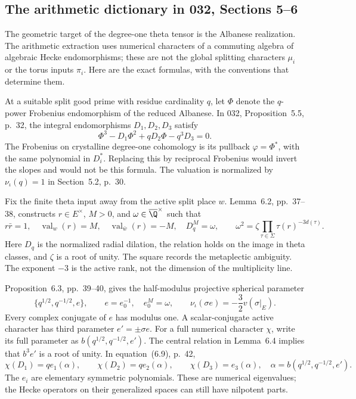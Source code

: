 \subsection{The arithmetic dictionary in 032, Sections 5--6}

The geometric target of the degree-one theta tensor is the Albanese
realization. The arithmetic extraction uses numerical characters of a
commuting algebra of algebraic Hecke endomorphisms; these are not the
global splitting characters $\mu_i$ or the torus inputs $\pi_i$.
Here are the exact formulas, with the conventions that determine them.

At a suitable split good prime with residue cardinality $q$, let
$\Phi$ denote the $q$-power Frobenius endomorphism of the reduced
Albanese. In 032, Proposition~5.5, p.~32, the integral endomorphisms
$D_1,D_2,D_3$ satisfy
\[
 \Phi^3-D_1\Phi^2+qD_2\Phi-q^3D_3=0.
\]
The Frobenius on crystalline degree-one cohomology is its pullback
$\varphi=\Phi^*$, with the same polynomial in $D_i^*$.
Replacing this by reciprocal Frobenius would invert the slopes and
would not be this formula. The valuation is normalized by
$\nu_\iota(q)=1$ in Section~5.2, p.~30.

Fix the finite theta input away from the active split place $w$.
Lemma~6.2, pp.~37--38, constructs $r\in E^\times$, $M>0$, and
$\omega\in\overline\Q^\times$ such that
\[
 r\bar r=1,\quad \operatorname{val}_w(r)=M,
 \quad\operatorname{val}_{\bar w}(r)=-M,
 \quad D_q^M=\omega,
 \qquad
 \omega^2=\zeta\prod_{\tau\in\Sigma}\tau(r)^{-3d(\tau)}.
\]
Here $D_q$ is the normalized radial dilation, the relation holds on
the image in theta classes, and $\zeta$ is a root of unity. The
square records the metaplectic ambiguity. The exponent $-3$ is
the active rank, not the dimension of the multiplicity line.

Proposition~6.3, pp.~39--40, gives the half-modulus projective
spherical parameter
\[
 \{q^{1/2},q^{-1/2},e\},\qquad
 e=e_0^{-1},\quad e_0^M=\omega,
 \qquad
 \nu_\iota(\sigma e)=-\frac32v(\sigma|_E).
\]
Every complex conjugate of $e$ has modulus one. A scalar-conjugate
active character has third parameter $e'=\pm\sigma e$.
For a full numerical character $\chi$, write its full parameter as
$b(q^{1/2},q^{-1/2},e')$. The central relation in Lemma~6.4
implies that $b^3e'$ is a root of unity. In equation~(6.9), p.~42,
\[
 \chi(D_1)=q e_1(\alpha),\qquad
 \chi(D_2)=q e_2(\alpha),\qquad
 \chi(D_3)=e_3(\alpha),
 \quad\alpha=b(q^{1/2},q^{-1/2},e').
\]
The $e_i$ are elementary symmetric polynomials. These are numerical
eigenvalues; the Hecke operators on their generalized spaces can
still have nilpotent parts.

